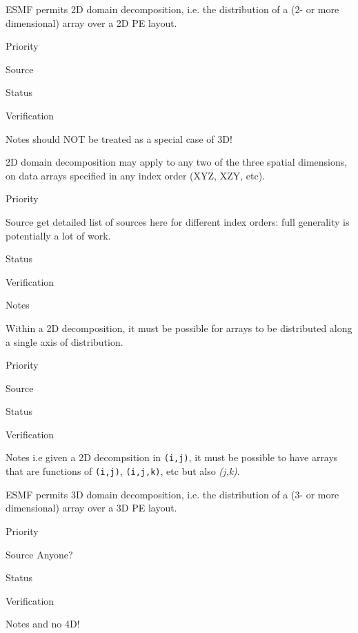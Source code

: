 ESMF permits 2D domain decomposition, i.e. the distribution of a
(2- or more dimensional) array over a 2D PE layout.

\begin{reqlist}
\item[Priority]
\item[Source]
\item[Status]
\item[Verification]
\item[Notes] should NOT be treated as a special case of 3D!
\end{reqlist}


2D domain decomposition may apply to any two of the three spatial
dimensions, on data arrays specified in any index order (XYZ, XZY,
etc).

\begin{reqlist}
\item[Priority]
\item[Source] get detailed list of sources here for different index
  orders: full generality is potentially a lot of work.
\item[Status]
\item[Verification]
\item[Notes]
\end{reqlist}


Within a 2D decomposition, it must be possible for arrays to be
distributed along a single axis of distribution.

\begin{reqlist}
\item[Priority]
\item[Source]
\item[Status]
\item[Verification]
\item[Notes] i.e given a 2D decompsition in \texttt{(i,j)}, it must be
  possible to have arrays that are functions of \texttt{(i,j)},
  \texttt{(i,j,k)}, etc but also \emph{(j,k)}.
\end{reqlist}


ESMF permits 3D domain decomposition, i.e. the distribution of a
(3- or more dimensional) array over a 3D PE layout.

\begin{reqlist}
\item[Priority]
\item[Source] Anyone?
\item[Status]
\item[Verification]
\item[Notes] and no 4D!
\end{reqlist}

